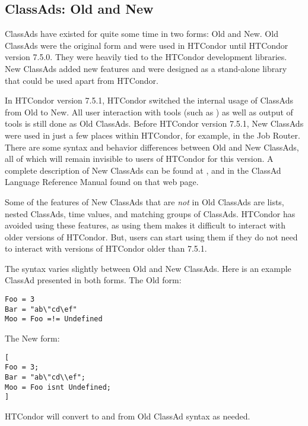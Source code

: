 \subsection{\label{sec:classad-newandold}
ClassAds: Old and New}

ClassAds have existed for quite some time in two forms:
Old and New.
Old ClassAds were the original form and were used in HTCondor
until HTCondor version 7.5.0.
They were heavily tied to the HTCondor development libraries.
New ClassAds added new features
and were designed as a stand-alone library that could be used apart
from HTCondor.

In HTCondor version 7.5.1, HTCondor switched the internal usage of
ClassAds from Old to New.
All user interaction with tools (such as ) as well as
output of tools is still done as Old ClassAds.
Before HTCondor version 7.5.1, New ClassAds were used in just a few places 
within HTCondor, 
for example, in the Job Router.
There are some syntax and behavior differences between Old and New
ClassAds,
all of which will remain invisible to users of HTCondor for this version.
A complete description of New ClassAds can be found at
,
and in the ClassAd Language Reference Manual found on that web page.

Some of the features of New ClassAds that are \emph{not} in Old ClassAds are
lists, nested ClassAds, time values, and matching groups of ClassAds.
HTCondor has avoided using these features,
as using them makes it difficult to interact with older versions of HTCondor.
But, users can start using them if they do not need to interact with
versions of HTCondor older than 7.5.1.

The syntax varies slightly between Old and New ClassAds.
Here is an example ClassAd presented in both forms.
The Old form:

\begin{verbatim}
Foo = 3
Bar = "ab\"cd\ef"
Moo = Foo =!= Undefined
\end{verbatim}

The New form:

\begin{verbatim}
[
Foo = 3;
Bar = "ab\"cd\\ef";
Moo = Foo isnt Undefined;
]
\end{verbatim}

HTCondor will convert to and from Old ClassAd syntax as needed.

